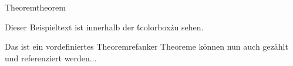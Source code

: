 \usepackage{xcolor}
\usepackage{tkiz,pgf,verbatim,environ,etoolbox} %
\usepackage[most]{tcolorbox}

%
  {Theorem}{}{theorem}

\begin{tcolorbox}[colback=green!5!white,colframe=green!50!black,title=TColorBox Heading]
Dieser Beispieltext ist innerhalb der \'tcolorbox\' zu sehen.
\end{tcolorbox}

\begin{theo}{Das ist ein vordefiniertes Theorem}{refanker}
  Theoreme können nun auch gezählt und referenziert werden...
\end{theo}